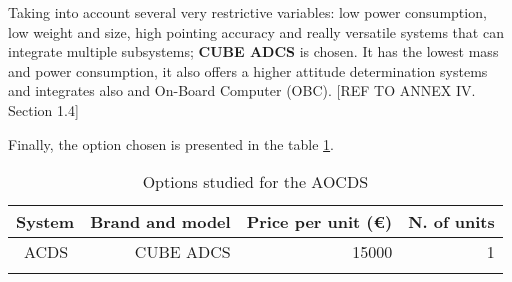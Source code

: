 Taking into account several very restrictive variables: low power consumption, low weight and size, high pointing accuracy and really versatile systems that can integrate multiple subsystems; \textbf{CUBE ADCS} is chosen. It has the lowest mass and power consumption, it also offers a higher attitude determination systems and integrates also and On-Board Computer (OBC). [{REF TO ANNEX IV. Section 1.4}]

Finally, the option chosen is presented in the table \ref{tab:eps_final}.

\begin{longtable}{| l | r | r | r | }
\hline
\rowcolor[gray]{0.80}	\textbf{System} &  \textbf{Brand and model}     & \textbf{Price per unit (\euro)}  & \textbf{N. of units}  \\
\hline
\endfirsthead

	   ~ACDS & CUBE ADCS & 15000 & 1\\
	\hline

\caption{Options studied for the AOCDS}
\label{tab:eps_final}
\end{longtable}